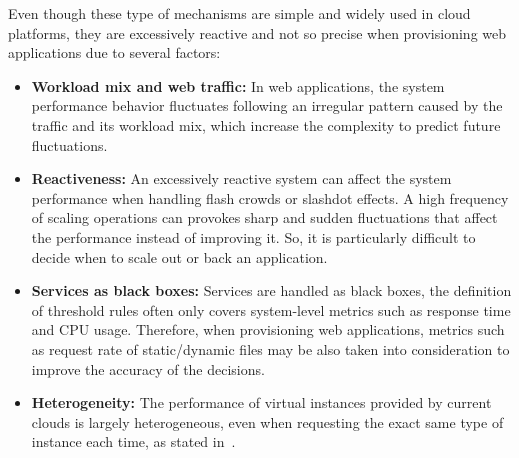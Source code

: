 
Even though these type of mechanisms are simple and widely used in cloud platforms, they are excessively reactive and not so precise when provisioning web applications due to several factors: 


\begin{itemize}
\item  \textbf{Workload mix and web traffic:} In web applications, the system performance behavior fluctuates following an irregular pattern caused by the traffic and its workload mix, which increase the complexity to predict future fluctuations. 


\item \textbf{Reactiveness:} An excessively reactive system can affect the system performance when handling flash crowds or slashdot effects. A high frequency of scaling operations can provokes sharp and sudden fluctuations that affect the performance instead of improving it. So, it is particularly difficult to decide when to scale out or back an application. 

\item \textbf{Services as black boxes:} Services are handled as black boxes, the definition of threshold rules often only covers system-level metrics such as response time and CPU usage. Therefore, when provisioning web applications, metrics such as request rate of static/dynamic files may be also taken into consideration to improve the accuracy of the decisions.



\item  \textbf{Heterogeneity:} The performance of virtual instances provided by current clouds is largely heterogeneous, even when requesting the exact same type of instance each time, as stated in~\cite{ec2Performance}. 


\end{itemize}

